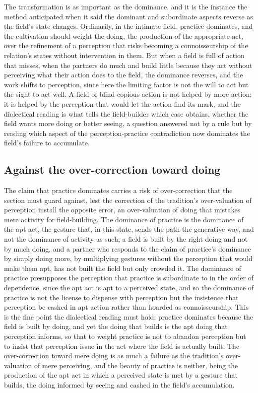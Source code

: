 The transformation is as important as the dominance, and it is the instance the method anticipated when it said the dominant and subordinate aspects reverse as the field's state changes. Ordinarily, in the intimate field, practice dominates, and the cultivation should weight the doing, the production of the appropriate act, over the refinement of a perception that risks becoming a connoisseurship of the relation's states without intervention in them. But when a field is full of action that misses, when the partners do much and build little because they act without perceiving what their action does to the field, the dominance reverses, and the work shifts to perception, since here the limiting factor is not the will to act but the sight to act well. A field of blind copious action is not helped by more action; it is helped by the perception that would let the action find its mark, and the dialectical reading is what tells the field-builder which case obtains, whether the field wants more doing or better seeing, a question answered not by a rule but by reading which aspect of the perception-practice contradiction now dominates the field's failure to accumulate.

\subsection{Against the over-correction toward doing}
\label{p22:sub:practice-overcorrection}

The claim that practice dominates carries a risk of over-correction that the section must guard against, lest the correction of the tradition's over-valuation of perception install the opposite error, an over-valuation of doing that mistakes mere activity for field-building. The dominance of practice is the dominance of the apt act, the gesture that, in this state, sends the path the generative way, and not the dominance of activity as such; a field is built by the right doing and not by much doing, and a partner who responds to the claim of practice's dominance by simply doing more, by multiplying gestures without the perception that would make them apt, has not built the field but only crowded it. The dominance of practice presupposes the perception that practice is subordinate to in the order of dependence, since the apt act is apt to a perceived state, and so the dominance of practice is not the license to dispense with perception but the insistence that perception be cashed in apt action rather than hoarded as connoisseurship. This is the fine point the dialectical reading must hold: practice dominates because the field is built by doing, and yet the doing that builds is the apt doing that perception informs, so that to weight practice is not to abandon perception but to insist that perception issue in the act where the field is actually built. The over-correction toward mere doing is as much a failure as the tradition's over-valuation of mere perceiving, and the beauty of practice is neither, being the production of the apt act in which a perceived state is met by a gesture that builds, the doing informed by seeing and cashed in the field's accumulation.

